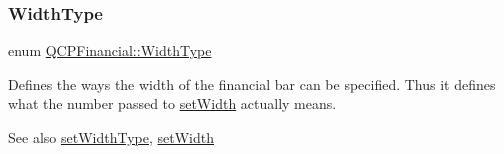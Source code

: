 \subsubsection{\texorpdfstring{Width\+Type}{WidthType}\hspace{0.1cm}{\footnotesize\ttfamily [1/2]}}
{\footnotesize\ttfamily enum \hyperlink{class_q_c_p_financial_aef1761dda71a53dc5269685e9e492626}{Q\+C\+P\+Financial\+::\+Width\+Type}}

Defines the ways the width of the financial bar can be specified. Thus it defines what the number passed to \hyperlink{class_q_c_p_financial_a99633f8bac86a61d534ae5eeb1a3068f}{set\+Width} actually means.

\begin{DoxySeeAlso}{See also}
\hyperlink{class_q_c_p_financial_a204b7b710352796593a432b723e34089}{set\+Width\+Type}, \hyperlink{class_q_c_p_financial_a99633f8bac86a61d534ae5eeb1a3068f}{set\+Width} 
\end{DoxySeeAlso}
